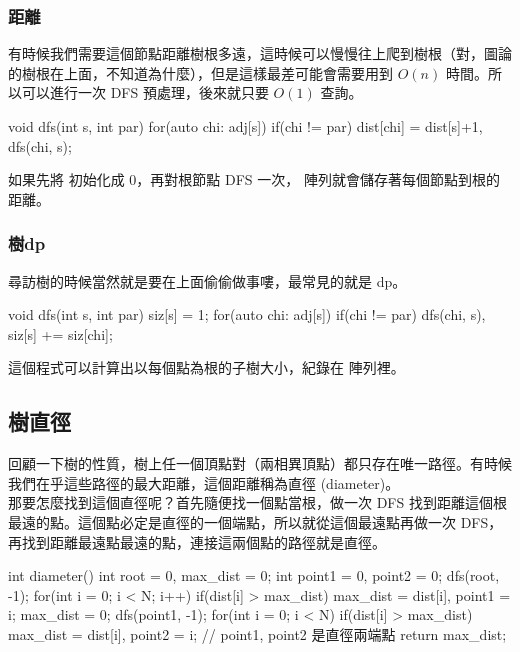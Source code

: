 \documentclass[main.tex]{subfiles}
\begin{document}
\subsubsection{距離}

有時候我們需要這個節點距離樹根多遠，這時候可以慢慢往上爬到樹根（對，圖論的樹根在上面，不知道為什麼），但是這樣最差可能會需要用到 $O(n)$ 時間。所以可以進行一次 DFS 預處理，後來就只要 $O(1)$ 查詢。

\begin{C++}
void dfs(int s, int par){
	for(auto chi: adj[s]){
		if(chi != par) dist[chi] = dist[s]+1, dfs(chi, s);
	}
}
\end{C++}

如果先將  初始化成 $0$，再對根節點 DFS 一次， 陣列就會儲存著每個節點到根的距離。

\subsubsection{樹dp}
尋訪樹的時候當然就是要在上面偷偷做事嘍，最常見的就是 dp。\\

\begin{C++}
void dfs(int s, int par){
	siz[s] = 1;
	for(auto chi: adj[s]){
		if(chi != par) dfs(chi, s), siz[s] += siz[chi];
	}
}
\end{C++}

這個程式可以計算出以每個點為根的子樹大小，紀錄在  陣列裡。

\subsection{樹直徑}
回顧一下樹的性質，樹上任一個頂點對（兩相異頂點）都只存在唯一路徑。有時候我們在乎這些路徑的最大距離，這個距離稱為直徑 (diameter)。\\

那要怎麼找到這個直徑呢？首先隨便找一個點當根，做一次 DFS 找到距離這個根最遠的點。這個點必定是直徑的一個端點，所以就從這個最遠點再做一次 DFS，再找到距離最遠點最遠的點，連接這兩個點的路徑就是直徑。

\begin{C++}
int diameter(){
    int root = 0, max_dist = 0;
    int point1 = 0, point2 = 0;
    dfs(root, -1);
    for(int i = 0; i < N; i++)
        if(dist[i] > max_dist){
            max_dist = dist[i], point1 = i;
        }
    max_dist = 0;
    dfs(point1, -1);
    for(int i = 0; i < N)
        if(dist[i] > max_dist){
            max_dist = dist[i], point2 = i;
        }
    // point1, point2 是直徑兩端點
    return max_dist;
}
\end{C++}
\end{document}
